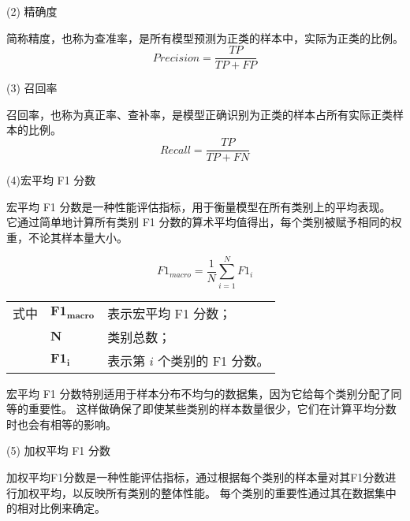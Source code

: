 (2) 精确度\par
简称精度，也称为查准率，是所有模型预测为正类的样本中，实际为正类的比例。
\begin{equation}
  \label{eq:val_score2}
  Precision = \frac{TP}{TP + FP}
\end{equation}

(3) 召回率\par
召回率，也称为真正率、查补率，是模型正确识别为正类的样本占所有实际正类样本的比例。
\begin{equation}
  \label{eq:val_score3} 
  Recall = \frac{TP}{TP + FN}
\end{equation}


(4)宏平均 F1 分数\par
宏平均 F1 分数是一种性能评估指标，用于衡量模型在所有类别上的平均表现。
它通过简单地计算所有类别 F1 分数的算术平均值得出，每个类别被赋予相同的权重，不论其样本量大小。

\begin{equation}
 \label{eq:val_score4}
F1_{macro} = \frac{1}{N} \sum\limits_{i=1}^{N} F1_i
\end{equation}
\begin{flushleft}
  \renewcommand\arraystretch{1.25}
  \begin{tabularx}{\textwidth}{@{}>{\normalsize\rm}l@{\quad}>{\normalsize\rm}l@{——}>{\normalsize\rm}X@{}}
  式中& $\symbf{F1_{macro}}$ &表示宏平均 F1 分数；\\
  &  $\symbf{N}$&类别总数；\\
  &  $\symbf{F1_i}$ & 表示第 $i$ 个类别的 F1 分数。\\
  \end{tabularx}\vspace{.5ex}%
\end{flushleft}

宏平均 F1 分数特别适用于样本分布不均匀的数据集，因为它给每个类别分配了同等的重要性。
这样做确保了即使某些类别的样本数量很少，它们在计算平均分数时也会有相等的影响。

(5) 加权平均 F1 分数\par
加权平均F1分数是一种性能评估指标，通过根据每个类别的样本量对其F1分数进行加权平均，以反映所有类别的整体性能。
每个类别的重要性通过其在数据集中的相对比例来确定。

